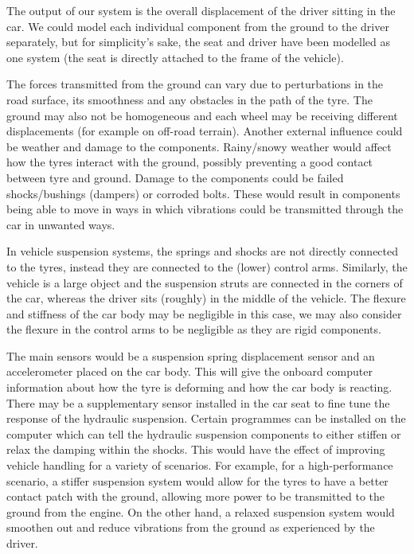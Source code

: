 \documentclass[11pt]{article}
\numberwithin{equation}{section}
\begin{document}
The output of our system is the overall displacement of the driver sitting in the car. We could model each individual component from the ground to the driver separately, but for simplicity's sake, the seat and driver have been modelled as one system (the seat is directly attached to the frame of the vehicle).

The forces transmitted from the ground can vary due to perturbations in the road surface, its smoothness and any obstacles in the path of the tyre. The ground may also not be homogeneous and each wheel may be receiving different displacements (for example on off-road terrain). Another external influence could be weather and damage to the components. Rainy/snowy weather would affect how the tyres interact with the ground, possibly preventing a good contact between tyre and ground. Damage to the components could be failed shocks/bushings (dampers) or corroded bolts. These would result in components being able to move in ways in which vibrations could be transmitted through the car in unwanted ways.

In vehicle suspension systems, the springs and shocks are not directly connected to the tyres, instead they are connected to the (lower) control arms. Similarly, the vehicle is a large object and the suspension struts are connected in the corners of the car, whereas the driver sits (roughly) in the middle of the vehicle. The flexure and stiffness of the car body may be negligible in this case, we may also consider the flexure in the control arms to be negligible as they are rigid components.

The main sensors would be a suspension spring displacement sensor and an accelerometer placed on the car body. This will give the onboard computer information about how the tyre is deforming and how the car body is reacting. There may be a supplementary sensor installed in the car seat to fine tune the response of the hydraulic suspension. Certain programmes can be installed on the computer which can tell the hydraulic suspension components to either stiffen or relax the damping within the shocks. This would have the effect of improving vehicle handling for a variety of scenarios. For example, for a high-performance scenario, a stiffer suspension system would allow for the tyres to have a better contact patch with the ground, allowing more power to be transmitted to the ground from the engine. On the other hand, a relaxed suspension system would smoothen out and reduce vibrations from the ground as experienced by the driver.
\end{document}
